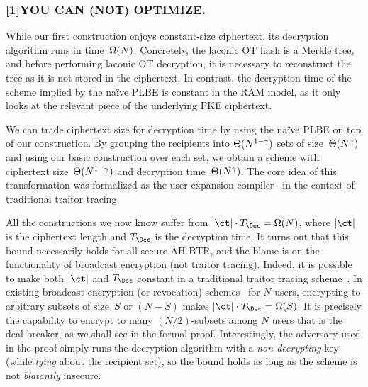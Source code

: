\subsubsection{\scalebox{0.8}[1]{{\bfseries\selectfont YOU CAN (NOT) OPTIMIZE\@.}}}
While our first construction enjoys constant-size ciphertext,
its decryption algorithm runs in time~$\operatorname{\Omega}(N)$.
Concretely, the laconic OT hash is a Merkle tree, and before performing laconic OT decryption, it is necessary to reconstruct the tree as it is not stored in the ciphertext.
In contrast, the decryption time of the scheme implied by the na{\"i}ve PLBE is constant in the RAM model, as it only looks at the relevant piece of the underlying PKE ciphertext.

We can trade ciphertext size for decryption time by using the na{\"i}ve PLBE on top of our construction.
By grouping the recipients into $\operatorname{\Theta}(N^{1-\gamma})$ sets of size~$\operatorname{\Theta}(N^\gamma)$ and using our basic construction over each set, we obtain a scheme with ciphertext size~$\operatorname{\Theta}(N^{1-\gamma})$ and decryption time~$\operatorname{\Theta}(N^\gamma)$.
The core idea of this transformation was formalized as the user expansion compiler~\cite{C:Zhandry20} in the context of traditional traitor tracing.

All the constructions we now know suffer from ${|\ct|\cdot T_\Dec=\bigOmega(N)}$,
where $|\ct|$ is the ciphertext length and $T_\Dec$ is the decryption time.
It turns out that this bound necessarily holds for all secure AH-BTR, and
the blame is on the functionality of broadcast encryption (not traitor tracing).
Indeed,
it is possible to make both $|\ct|$ and $T_\Dec$ constant in a traditional traitor tracing scheme~\cite{C:BonZha14}.
In existing broadcast encryption (or revocation) schemes~\cite{C:BonGenWat05,AC:Delerablee07,EC:GenWat09,C:BonZha14,EC:AgrYam20,TCC:AgrWicYam20,ITCS:BraVai22} for $N$ users,
encrypting to arbitrary subsets of size~$S$ or $({N-S})$ makes ${|\ct|\cdot T_\Dec=\bigOmega(S)}$.
It is precisely the capability to encrypt to many ${(N/2)}$-subsets among $N$ users that is the deal breaker, as we shall see in the formal proof.
Interestingly,
the adversary used in the proof
simply runs the decryption algorithm with a \emph{non-decrypting} key
(while \emph{lying} about the recipient set),
so the bound holds as long as the scheme is not \emph{blatantly} insecure.

